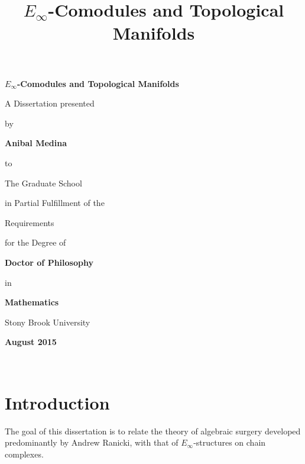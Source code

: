 \documentclass[12pt,oneside]{book}
\begin{document}
\frontmatter
    \title{\bf{$E_\infty$-Comodules and Topological Manifolds}}

    \vspace*{3\baselineskip}
    \centerline{\bf{$E_\infty$-Comodules and Topological Manifolds}}
    \vspace*{1\baselineskip}
    \centerline{A Dissertation presented}
    \vspace*{1\baselineskip}
    \centerline{by}
    \vspace*{1\baselineskip}
    \centerline{\bf{Anibal Medina}}
    \vspace*{1\baselineskip}
    \centerline{to}
    \vspace*{1\baselineskip}
    \centerline{The Graduate School}
    \vspace*{1\baselineskip}
    \centerline{in Partial Fulfillment of the}
    \vspace*{1\baselineskip}
    \centerline{Requirements}
    \vspace*{1\baselineskip}
    \centerline{for the Degree of}
    \vspace*{1\baselineskip}
    \centerline{\bf{Doctor of Philosophy}}
    \vspace*{1\baselineskip}
    \centerline{in}
    \vspace*{1\baselineskip}
    \centerline{\bf{Mathematics}}

    \vspace*{2\baselineskip}
    \centerline{Stony Brook University}
    \vspace*{2\baselineskip}
    \centerline{\bf{August 2015}}

\newpage
\ \\
\newpage

  \tableofcontents
  \cleardoublepage
\mainmatter
  \chapter*{Introduction}
    The goal of this dissertation is to relate the theory of algebraic surgery developed predominantly by Andrew Ranicki, with that of $E_\infty$-structures on chain complexes.

\thispagestyle{plain}
\end{document}
